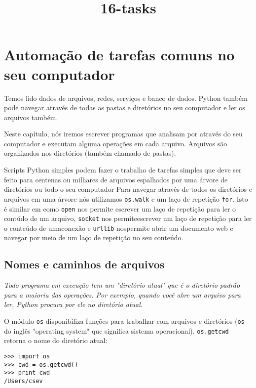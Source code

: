 \documentclass{book}
\title{16-tasks}
\begin{document}
\chapter{Automação de tarefas comuns no seu computador}

Temos lido dados de arquivos, redes, serviços e banco de dados.
Python também pode navegar através de todas as pastas e diretórios 
no seu computador e ler os arquivos também.

Neste capítulo, nós iremos escrever programas que analisam por através do seu computador e executam alguma operações em cada arquivo. Arquivos são organizados nos diretórios (também chamado de pastas).

Scripts Python simples podem fazer o trabalho de tarefas simples que deve ser feito para
centenas ou milhares de arquivos espalhados por uma árvore de diretórios ou todo o seu computador
Para navegar através de todos os diretórios e arquivos em uma árvore nós utilizamos 
{\tt os.walk} e um laço de repetição {\tt for}. Isto é similar em como {\tt open} nos permite escrever um laço de repetição para ler o contúdo de um arquivo, {\tt socket} nos permiteescrever um laço de repetição para ler o conteúdo de umaconexão e {\tt urllib} nospermite abrir um documento web e navegar por meio de um laço de repetição no seu conteúdo. 

\section{Nomes e caminhos de arquivos}

\label{paths}


{\it Todo programa em execução tem um "diretório atual" que é o diretório padrão para a maioria das operações. Por exemplo, quando você abre um arquivo para ler, Python procura por ele no diretório atual.}


O módulo {\tt os} disponibiliza funções para trabalhar com arquivos e diretórios ({\tt os} do inglês "operating system" que significa sistema operacional).  
{\tt os.getcwd} retorna o nome do diretório atual:


\begin{verbatim}
>>> import os
>>> cwd = os.getcwd()
>>> print cwd
/Users/csev
\end{verbatim}
\end{document}
